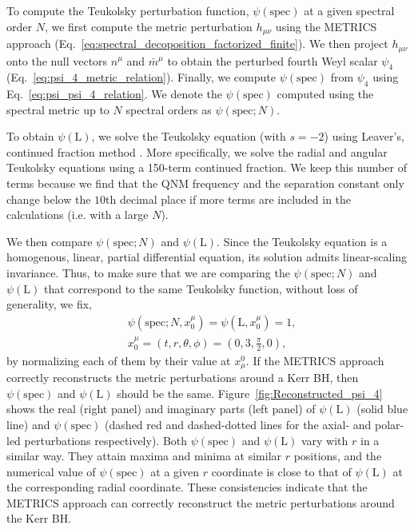 \documentclass[aps,prx,amsmath,floats,floatfix,twocolumn,
  superscriptaddress,nofootinbib,showpacs]{revtex4-1}
\begin{document}
To compute the Teukolsky perturbation function, $\psi(\text{spec})$ at a given spectral order $N$, we first compute the metric perturbation $h_{\mu \nu}$ using the METRICS approach (Eq.~\eqref{eq:spectral_decoposition_factorized_finite}). 
We then project $h_{\mu \nu}$ onto the null vectors $n^\mu$ and $\bar{m}^\mu$ to obtain the perturbed fourth Weyl scalar $\psi_4$ (Eq.~\eqref{eq:psi_4_metric_relation}). 
Finally, we compute $\psi(\text{spec})$ from $\psi_4$ using Eq.~\eqref{eq:psi_psi_4_relation}. We denote the $\psi(\text{spec})$ computed using the spectral metric up to $N$ spectral orders as $\psi(\text{spec}; N)$.

To obtain $\psi(\text{L})$, we solve the Teukolsky equation (with $s=-2$) using Leaver's, continued fraction method \cite{Leaver:1985ax}. More specifically, we solve the radial and angular Teukolsky equations using a 150-term continued fraction. 
We keep this number of terms because we find that the QNM frequency and the separation constant only change below the $10$th decimal place 
if more terms are included in the calculations (i.e. with a large $N$). 

We then compare $\psi(\text{spec}; N)$ and $\psi(\text{L})$.
Since the Teukolsky equation is a homogenous, linear, partial differential equation, its solution admits linear-scaling invariance.
Thus, to make sure that we are comparing the $\psi(\text{spec}; N)$ and $\psi(\text{L})$ that correspond to the same Teukolsky function, without loss of generality, we fix,
\begin{equation}
\begin{split}
& \psi \left(\text{spec}; N, x^{\mu}_0 \right) = \psi \left(\text{L}, x^{\mu}_0 \right) = 1, \\
& x^{\mu}_0 = (t, r, \theta, \phi) = \left(0, 3, \frac{\pi}{2}, 0 \right),  
\end{split}
\end{equation}
by normalizing each of them by their value at $x_{\mu}^{0}$.
If the METRICS approach correctly reconstructs the metric perturbations around a Kerr BH, then $\psi(\text{spec})$ and $\psi(\text{L})$ should be the same.
Figure~\ref{fig:Reconstructed_psi_4} shows the real (right panel) and imaginary parts (left panel) of $\psi(\text{L})$ (solid blue line) and $\psi(\text{spec})$ (dashed red and dashed-dotted lines for the axial- and polar-led perturbations respectively).
Both $\psi(\text{spec})$ and $\psi(\text{L})$ vary with $r$ in a similar way. 
They attain maxima and minima at similar $r$ positions, and the numerical value of $\psi(\text{spec})$ at a given $r$ coordinate is close to that of $\psi(\text{L})$ at the corresponding radial coordinate. 
These consistencies indicate that the METRICS approach can correctly reconstruct the metric perturbations around the Kerr BH.
\end{document}
